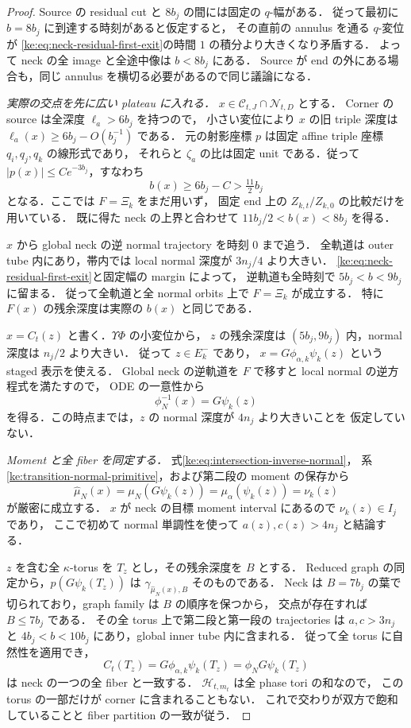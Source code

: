 \begin{proof}
Source の residual cut と $8b_j$ の間には固定の $q$-幅がある．
従って最初に $b=8b_j$ に到達する時刻があると仮定すると，
その直前の annulus を通る $q$-変位が
\eqref{ke:eq:neck-residual-first-exit}の時間 $1$ の積分より大きくなり矛盾する．
よって neck の全 image と全途中像は $b<8b_j$ にある．
Source が end の外にある場合も，同じ annulus を横切る必要があるので同じ議論になる．

\emph{実際の交点を先に広い plateau に入れる．}
$x\in\mathcal C_{t,J}\cap\mathcal N_{t,D}$ とする．
Corner の source は全深度 $\ell_a>6b_j$ を持つので，
小さい変位により $x$ の旧 triple 深度は
$\ell_a(x)\ge6b_j-O(b_j^{-1})$ である．
元の射影座標 $p$ は固定 affine triple 座標 $q_i,q_j,q_k$ の線形式であり，
それらと $\zeta_a$ の比は固定 unit である．従って
$|p(x)|\le C e^{-3b_j}$，すなわち
\[
 b(x)\ge6b_j-C>\tfrac{11}{2}b_j
\]
となる．ここでは $F=\Xi_k$ をまだ用いず，
固定 end 上の $Z_{k,t}/Z_{k,0}$ の比較だけを用いている．
既に得た neck の上界と合わせて
$11b_j/2<b(x)<8b_j$ を得る．

$x$ から global neck の逆 normal trajectory を時刻 $0$ まで追う．
全軌道は outer tube 内にあり，帯内では local normal 深度が $3n_j/4$ より大きい．
\eqref{ke:eq:neck-residual-first-exit}と固定幅の margin によって，
逆軌道も全時刻で $5b_j<b<9b_j$ に留まる．
従って全軌道と全 normal orbits 上で $F=\Xi_k$ が成立する．
特に $F(x)$ の残余深度は実際の $b(x)$ と同じである．

$x=C_t(z)$ と書く．$\Upsilon\Phi$ の小変位から，
$z$ の残余深度は $(5b_j,9b_j)$ 内，normal 深度は $n_j/2$ より大きい．
従って $z\in E_k^-$ であり，
$x=G\phi_{\alpha,k}\psi_k(z)$ という staged 表示を使える．
Global neck の逆軌道を $F$ で移すと local normal の逆方程式を満たすので，
ODE の一意性から
\begin{equation}\label{ke:eq:intersection-inverse-normal}
 \phi_N^{-1}(x)=G\psi_k(z)
\end{equation}
を得る．この時点までは，$z$ の normal 深度が $4n_j$ より大きいことを
仮定していない．

\emph{Moment と全 fiber を同定する．}
式\eqref{ke:eq:intersection-inverse-normal}，
系\ref{ke:transition-normal-primitive}，および第二段の moment の保存から
\[
 \widehat\mu_N(x)=\mu_N(G\psi_k(z))
                =\mu_\alpha(\psi_k(z))=\nu_k(z)
\]
が厳密に成立する．
$x$ が neck の目標 moment interval にあるので $\nu_k(z)\in I_j$ であり，
ここで初めて normal 単調性を使って $a(z),c(z)>4n_j$ と結論する．

$z$ を含む全 $\kappa$-torus を $T_z$ とし，その残余深度を $B$ とする．
Reduced graph の同定から，$p(G\psi_k(T_z))$ は
$\gamma_{\widehat\mu_N(x),B}$ そのものである．
Neck は $B=7b_j$ の葉で切られており，graph family は $B$ の順序を保つから，
交点が存在すれば $B\le7b_j$ である．
その全 torus 上で第二段と第一段の trajectories は
$a,c>3n_j$ と $4b_j<b<10b_j$ にあり，global inner tube 内に含まれる．
従って全 torus に自然性を適用でき，
\[
 C_t(T_z)=G\phi_{\alpha,k}\psi_k(T_z)
          =\phi_NG\psi_k(T_z)
\]
は neck の一つの全 fiber と一致する．
$\mathcal H_{t,m_t}$ は全 phase tori の和なので，
この torus の一部だけが corner に含まれることもない．
これで交わりが双方で飽和していることと fiber partition の一致が従う．


\end{proof}
